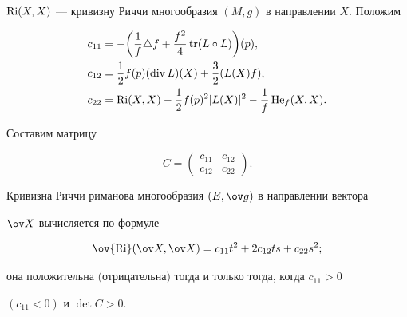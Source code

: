 $\operatorname{Ri}(X,X)$ --- кривизну Риччи многообразия $(M,g)$ в направлении $X$. Положим


\begin{equation}


\begin{split}








c_{11}&=-\bigg(\frac{1}{f}\triangle f+\frac{f^{2}}{4}\tr(L\circ


L)\bigg)(p),\\




c_{12}&=\frac{1}{2}f(p)(\div


L)(X)+\frac{3}{2}(L(X)f),\\




c_{22}&=\Ri(X,X)-\frac{1}{2}f(p)^2|L(X)|^{2}-


\frac{1}{f}\He_f(X,X).






\end{split}


\end{equation}


Составим матрицу


$$


C=\begin{pmatrix} c_{11} & c_{12} \\ c_{12} & c_{22} \end{pmatrix}.


$$





\begin{thm}


Кривизна Риччи риманова многообразия $(E,\ov g)$ в направлении вектора


$\ov X$ вычисляется по формуле


\begin{equation}


\ov{\Ri}(\ov X,\ov X)=c_{11}t^{2}+2c_{12}ts+c_{22}s^{2};


\end{equation}


она положительна $($отрицательна$)$ тогда и только тогда, когда $c_{11}>0$


$(c_{11}<0)$ и $\det C>0$.


\end{thm}





